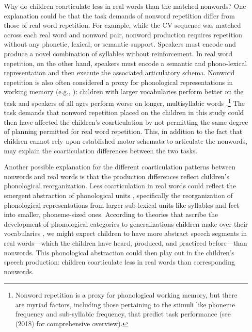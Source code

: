 \documentclass[a4paper,man,natbib,donotrepeattitle, apacite]{apa6}
\begin{document}
Why do children coarticulate less in real words than the matched nonwords? One explanation could be that the task demands of nonword repetition differ from those of real word repetition. For example, while the CV sequence was matched across each real word and nonword pair, nonword production requires repetition without any phonetic, lexical, or semantic support. Speakers must encode and produce a novel combination of syllables without reinforcement. In real word repetition, on the other hand, speakers must encode a semantic and phono-lexical representation and then execute the associated articulatory schema. Nonword repetition is also often considered a proxy for phonological representations in working memory (e.g., ): children with larger vocabularies perform better on the task \cite{edwardsInteractionVocabularySize2004,munsonRelationshipsNonwordRepetition2005} and speakers of all ages perform worse on longer, multisyllabic words \cite{byrdNonwordRepetitionPhoneme2012}.\footnote{Nonword repetition is a proxy for phonological working memory, but there are myriad factors, including those pertaining to the stimuli like phoneme frequency and sub-syllabic frequency, that predict task performance (see \citeauthor{szewczykNonwordRepetitionDepends2018} (2018) for comprehensive overview).} The task demands that nonword repetition placed on the children in this study could then have affected the children’s coarticulation by not permitting the same degree of planning permitted for real word repetition. This, in addition to the fact that children cannot rely upon established motor schemata to articulate the nonwords, may explain the coarticulation differences between the two tasks. 

Another possible explanation for the different coarticulation patterns between nonwords and real words is that the production differences reflect children’s phonological reorganization. Less coarticulation in real words could reflect the emergent abstraction of phonological units \cite{mcallisterbyunMotorInfluencesGrammar2016,nittrouerEmergencePhoneticSegments1989,nittrouerHowChildrenLearn1996,zharkovaCoarticulationIndicatorSpeech2011}, specifically the reorganization of phonological representations from larger sub-lexical units like syllables and feet into smaller, phoneme-sized ones. According to theories that ascribe the development of phonological categories to generalizations children make over their vocabularies \cite{beckmanGeneralizingLexiconsPredict2010,metsalaSpokenVocabularyGrowth1998,sosaLexicalPhonologicalEffects2012,stoel-gammonRelationshipsLexicalPhonological2011}, we might expect children to have more abstract speech segments in real words---which the children have heard, produced, and practiced before---than nonwords. This phonological abstraction could then play out in the children’s speech production: children coarticulate less in real words than corresponding nonwords. 
\end{document}

